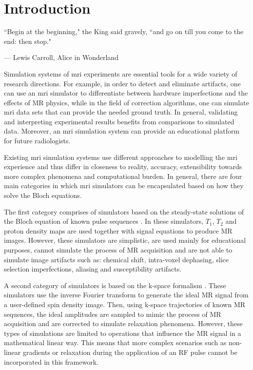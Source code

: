 \chapter{Introduction}
\label{chapterlabel1}
\epigraph{``Begin at the beginning," the King said gravely, ``and go on till you come to the end: then stop."}{--- \textup{Lewis Carroll}, Alice in Wonderland}


Simulation systems of \ac{mri} experiments are essential tools for a wide variety of research directions.
For example, in order to detect and eliminate artifacts, one can use an \ac{mri} simulator to differentiate between hardware imperfections and the effects of MR physics,
while in the field of correction algorithms, one can simulate \ac{mri} data sets that can provide the needed ground truth.
In general, validating and interpreting experimental results benefits from comparisons to simulated data.
Moreover, an \ac{mri} simulation system can provide an educational platform for future radiologists.

\hfill

Existing \ac{mri} simulation systems use different approaches to modelling the \ac{mri} experience and thus differ in closeness to reality, accuracy, extensibility towards more complex phenomena and computational burden.
In general, there are four main categories in which \ac{mri} simulators can be encapsulated based on how they solve the Bloch equations.

\hfill

The first category comprises of simulators based on the steady-state solutions of the Bloch equation of known pulse sequences \cite{Bobman1985} \cite{Lufkin1986} \cite{Ortendahl1984} \cite{Riederer1984}.
In these simulators, $T_1$, $T_2$ and proton density maps are used together with signal equations 
to produce MR images.
However, these simulators are simplistic, are used mainly for educational purposes, cannot simulate the process of MR acquisition and are not able to simulate image artifacts such as: chemical shift, intra-voxel dephasing, slice selection imperfections, aliasing and susceptibility artifacts.

\hfill

A second category of simulators is based on the k-space formalism \cite{Petersson1993}.
These simulators use the inverse Fourier transform to generate the ideal MR signal from a user-defined spin density image.
Then, using k-space trajectories of known MR sequences, the ideal amplitudes are sampled to mimic the process of MR acquisition and are corrected to simulate relaxation phenomena.
However, these types of simulations are limited to operations that influence the MR signal in a mathematical linear way.
This means that more complex scenarios such as non-linear gradients or relaxation during the application of an RF pulse cannot be incorporated in this framework.

